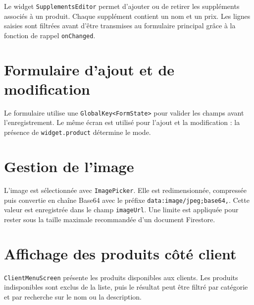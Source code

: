 \documentclass[12pt,a4paper]{report}
\begin{document}
Le widget \texttt{SupplementsEditor} permet d'ajouter ou de retirer les
suppléments associés à un produit. Chaque supplément contient un nom et un
prix. Les lignes saisies sont filtrées avant d'être transmises au formulaire
principal grâce à la fonction de rappel \texttt{onChanged}.



\section{Formulaire d'ajout et de modification}

Le formulaire utilise une \texttt{GlobalKey<FormState>} pour valider les champs
avant l'enregistrement. Le même écran est utilisé pour l'ajout et la modification :
la présence de \texttt{widget.product} détermine le mode.



\section{Gestion de l'image}

L'image est sélectionnée avec \texttt{ImagePicker}. Elle est redimensionnée,
compressée puis convertie en chaîne Base64 avec le préfixe
\texttt{data:image/jpeg;base64,}. Cette valeur est enregistrée dans le champ
\texttt{imageUrl}. Une limite est appliquée pour rester sous la taille maximale
recommandée d'un document Firestore.



\section{Affichage des produits côté client}

\texttt{ClientMenuScreen} présente les produits disponibles aux clients. Les
produits indisponibles sont exclus de la liste, puis le résultat peut être
filtré par catégorie et par recherche sur le nom ou la description.
\end{document}
